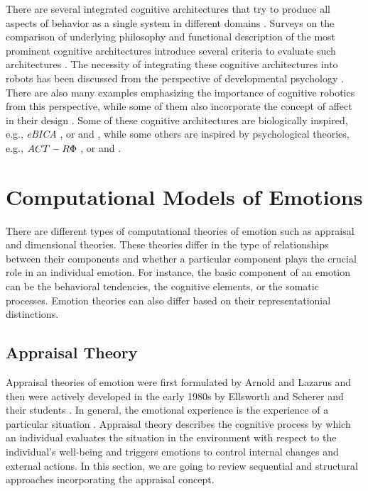 \documentclass[12pt]{report}
\begin{document}
There are several integrated cognitive architectures that try to produce all
aspects of behavior as a single system in different domains
\cite{anderson:act-r, laird:soar}. Surveys on the comparison of
underlying philosophy and functional description of the most prominent cognitive
architectures introduce several criteria to evaluate such architectures
\cite{chong:cognitive-architectures-survey,langley:cognitive-architectures,
thorisson:cognitive-architectures-autonomy}. The necessity of integrating these
cognitive architectures into robots has been discussed from the perspective of
developmental psychology \cite{asada:cognitive-robotics-humanoid,
d'mello:computational-functional-modeling,
kelley:cognitive-robotics-psychology}. There are also many examples emphasizing
the importance of cognitive robotics from this perspective, while some of them
also incorporate the concept of affect in their design
\cite{cai:affective-model-psi}. Some of these cognitive architectures are
biologically inspired, e.g., \textit{eBICA}
\cite{samsonovich:emotional-biologically-architecture}, or
\cite{baxter:cognitive-architecture-hri} and
\cite{ray:self-sustaining-architecture}, while some others are inspired by
psychological theories, e.g., $\MakeUppercase{ACT-R\Phi}$
\cite{dancy:actR-physiology-affect}, or
\cite{mirolli:vygotskyan-cognitive-robotics} and
\cite{dominey:shared-intention-cognition}.

\section{Computational Models of Emotions}
There are different types of computational theories of emotion such as
appraisal and dimensional theories. These theories differ in the type of
relationships between their components and whether a particular component plays
the crucial role in an individual emotion. For instance, the basic component of
an emotion can be the behavioral tendencies, the cognitive elements, or the
somatic processes. Emotion theories can also differ based on their
representationial distinctions.

\subsection{Appraisal Theory}
\label{sec:appraisal-theory}

Appraisal theories of emotion were first formulated by Arnold
\cite{arnold:emotion-personality} and Lazarus \cite{lazarus:emotion-adaptation}
and then were actively developed in the early 1980s by Ellsworth and Scherer and
their students \cite{roseman:appraisal-theory}
\cite{sander:systems-approach-appraisal} \cite{scherer:nature-function-emotion}
\cite{scherer:emotions-emergent} \cite{scherer:appraisal-processes}. In
general, the emotional experience is the experience of a particular situation
\cite{frijda:emotions}. Appraisal theory describes the cognitive process by
which an individual evaluates the situation in the environment with respect to
the individual's well-being and triggers emotions to control internal changes
and external actions. In this section, we are going to review sequential and
structural approaches incorporating the appraisal concept.
\end{document}
